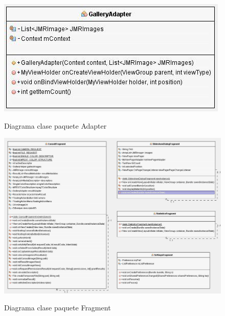 \begin{figure}[H] %
\centering
\includegraphics[scale=0.6]{imagenes/diagrama2.jpg}  %
\label{diagrama2}
\caption{Diagrama clase paquete Adapter}
\end{figure}

\begin{figure}[H] %
\centering
\includegraphics[scale=0.6]{imagenes/diagrama3.jpg}  %
\label{diagrama3}
\caption{Diagrama clase paquete Fragment}
\end{figure}

